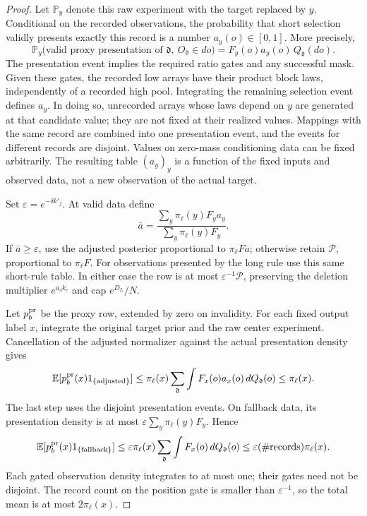 \begin{proof}
Let \(\mathbb P_y\) denote this raw experiment with the target replaced
by \(y\). Conditional on the recorded observations, the probability
that short selection validly presents exactly this record is a number
\(a_y(o)\in[0,1]\). More precisely,
\[
 \mathbb P_y\bigl(\text{valid proxy presentation of }\mathfrak d,
                  \ O_{\mathfrak d}\in do\bigr)
       =F_y(o)a_y(o)\,Q_{\mathfrak d}(do).
\]
The presentation event implies the required ratio gates and any successful
mask. Given these gates, the recorded low arrays have their product block
laws, independently of a recorded high pool. Integrating the remaining
selection event defines \(a_y\). In doing so, unrecorded arrays whose
laws depend on \(y\) are generated at that candidate value; they are
not fixed at their realized values. Mappings with the same record are
combined into one presentation event, and the events for different
records are disjoint. Values on zero-mass conditioning data can be fixed
arbitrarily. The resulting table \((a_y)_y\) is a function of the fixed
inputs and observed data, not a new observation of the actual target.

Set \(\varepsilon=e^{-\delta k'_j}\). At valid data define
\[
 \bar a=\frac{\sum_y\pi_\ell(y)F_ya_y}{\sum_y\pi_\ell(y)F_y}.
\]
If \(\bar a\ge\varepsilon\), use the adjusted posterior proportional
to \(\pi_\ell F a\); otherwise retain \(\mathcal P\), proportional
to \(\pi_\ell F\). For observations presented by the long rule use
this same short-rule table. In either case the row is at most
\(\varepsilon^{-1}\mathcal P\), preserving the deletion multiplier
\(e^{a_4k_c}\) and cap \(e^{D_L}/N\).

Let \(p_b^{\rm pr}\) be the proxy row, extended by zero on invalidity.
For each fixed output label \(x\), integrate the original target prior
and the raw center experiment. Cancellation of the adjusted normalizer
against the actual presentation density gives
\[
 \mathbb E[p_b^{\rm pr}(x)1_{\{\mathrm{adjusted}\}}]
 \le\pi_\ell(x)\sum_{\mathfrak d}
       \int F_x(o)a_x(o)\,dQ_{\mathfrak d}(o)
 \le\pi_\ell(x).
\]
The last step uses the disjoint presentation events. On fallback data,
its presentation density is at most \(\varepsilon\sum_y\pi_\ell(y)F_y\).
Hence
\[
 \mathbb E[p_b^{\rm pr}(x)1_{\{\mathrm{fallback}\}}]
 \le\varepsilon\pi_\ell(x)\sum_{\mathfrak d}
           \int F_x(o)\,dQ_{\mathfrak d}(o)
 \le\varepsilon(\#\mathrm{records})\pi_\ell(x).
\]
Each gated observation density integrates to at most one; their gates
need not be disjoint. The record count on the position gate is smaller
than \(\varepsilon^{-1}\), so the total mean is at most
\(2\pi_\ell(x)\).


\end{proof}
